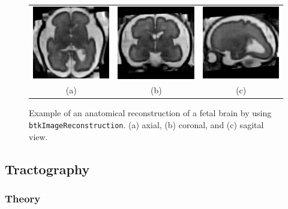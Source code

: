 \begin{figure}[t]
\centering
\begin{tabular}{ccc}
\includegraphics[width=0.3\columnwidth]{hr_axl.eps}&
\includegraphics[width=0.3\columnwidth]{hr_cor.eps}&
\includegraphics[width=0.3\columnwidth]{hr_sag.eps}\\
{(a)}&{(b)}&{(c)}\\
\end{tabular}
\caption{Example of an anatomical reconstruction of a fetal brain by using
\texttt{btkImageReconstruction}. (a) axial, (b) coronal, and (c) sagital view.}
\label{fig:reconstruction}
\end{figure}

\subsection{Tractography}
    \subsubsection*{Theory}

